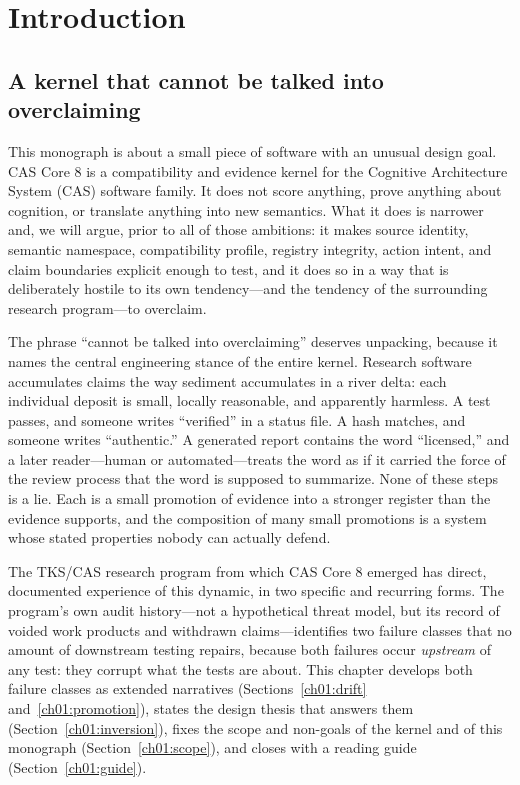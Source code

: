 \chapter{Introduction}\label{ch01:intro}

\section{A kernel that cannot be talked into overclaiming}\label{ch01:framing}

This monograph is about a small piece of software with an unusual design goal.
CAS Core 8 is a compatibility and evidence kernel for the Cognitive
Architecture System (CAS) software family. It does not score anything, prove
anything about cognition, or translate anything into new semantics. What it
does is narrower and, we will argue, prior to all of those ambitions: it makes
source identity, semantic namespace, compatibility profile, registry
integrity, action intent, and claim boundaries explicit enough to test, and it
does so in a way that is deliberately hostile to its own tendency---and the
tendency of the surrounding research program---to overclaim.

The phrase ``cannot be talked into overclaiming'' deserves unpacking, because
it names the central engineering stance of the entire kernel. Research
software accumulates claims the way sediment accumulates in a river delta:
each individual deposit is small, locally reasonable, and apparently
harmless. A test passes, and someone writes ``verified'' in a status file. A
hash matches, and someone writes ``authentic.'' A generated report contains
the word ``licensed,'' and a later reader---human or automated---treats the
word as if it carried the force of the review process that the word is
supposed to summarize. None of these steps is a lie. Each is a small
promotion of evidence into a stronger register than the evidence supports,
and the composition of many small promotions is a system whose stated
properties nobody can actually defend.

The TKS/CAS research program from which CAS Core 8 emerged has direct,
documented experience of this dynamic, in two specific and recurring forms.
The program's own audit history---not a hypothetical threat model, but its
record of voided work products and withdrawn claims---identifies two failure
classes that no amount of downstream testing repairs, because both failures
occur \emph{upstream} of any test: they corrupt what the tests are about.
This chapter develops both failure classes as extended narratives
(Sections~\ref{ch01:drift} and~\ref{ch01:promotion}), states the design
thesis that answers them (Section~\ref{ch01:inversion}), fixes the scope and
non-goals of the kernel and of this monograph
(Section~\ref{ch01:scope}), and closes with a reading guide
(Section~\ref{ch01:guide}).

